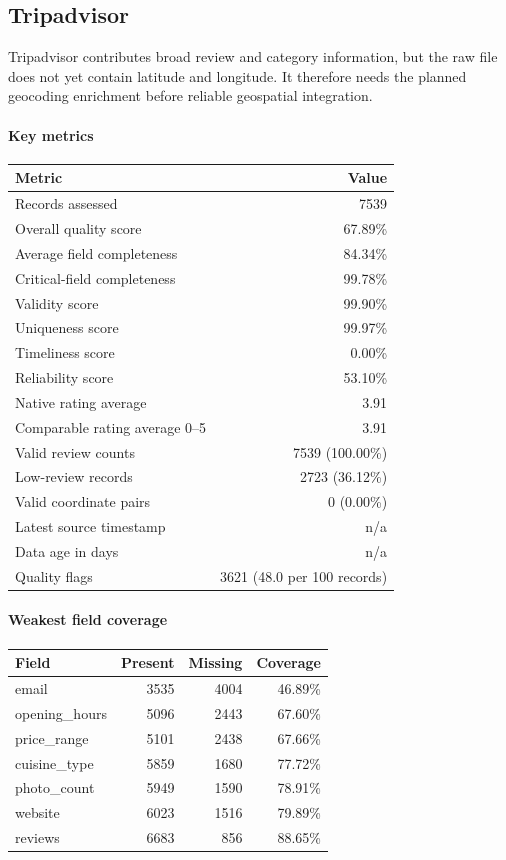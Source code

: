 \subsection{Tripadvisor}

Tripadvisor contributes broad review and category information, but the raw file does not yet contain latitude and longitude. It therefore needs the planned geocoding enrichment before reliable geospatial integration.

\paragraph{Key metrics}
\begin{tabular}{lr}
\toprule
Metric & Value \\
\midrule
Records assessed & 7539 \\
Overall quality score & 67.89\% \\
Average field completeness & 84.34\% \\
Critical-field completeness & 99.78\% \\
Validity score & 99.90\% \\
Uniqueness score & 99.97\% \\
Timeliness score & 0.00\% \\
Reliability score & 53.10\% \\
Native rating average & 3.91 \\
Comparable rating average 0--5 & 3.91 \\
Valid review counts & 7539 (100.00\%) \\
Low-review records & 2723 (36.12\%) \\
Valid coordinate pairs & 0 (0.00\%) \\
Latest source timestamp & n/a \\
Data age in days & n/a \\
Quality flags & 3621 (48.0 per 100 records) \\
\bottomrule
\end{tabular}

\paragraph{Weakest field coverage}
\begin{tabular}{lrrr}
\toprule
Field & Present & Missing & Coverage \\
\midrule
email & 3535 & 4004 & 46.89\% \\
opening\_hours & 5096 & 2443 & 67.60\% \\
price\_range & 5101 & 2438 & 67.66\% \\
cuisine\_type & 5859 & 1680 & 77.72\% \\
photo\_count & 5949 & 1590 & 78.91\% \\
website & 6023 & 1516 & 79.89\% \\
reviews & 6683 & 856 & 88.65\% \\
\bottomrule
\end{tabular}

